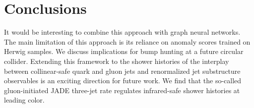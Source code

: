 \section{Conclusions}\label{sec:conclusions}

It would be interesting to combine this approach with graph neural
networks. The main limitation of this approach is its reliance on
anomaly scores trained on Herwig samples. We discuss implications for
bump hunting at a future circular collider. Extending this framework to
the shower histories of the interplay between collinear-safe quark and
gluon jets and renormalized jet substructure observables is an exciting
direction for future work. We find that the so-called gluon-initiated
JADE three-jet rate regulates infrared-safe shower histories at leading
color.

